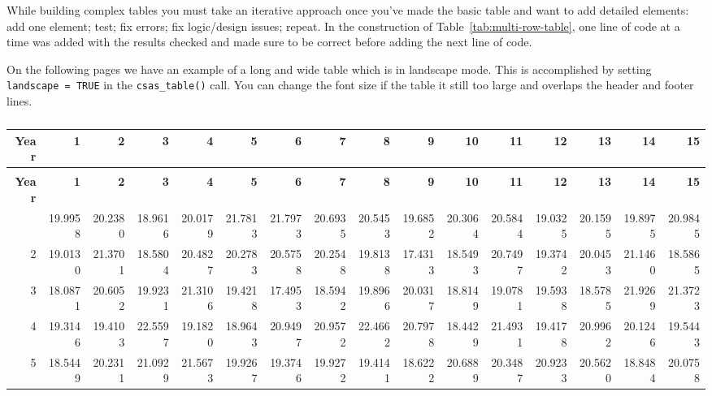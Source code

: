 \documentclass[12pt]{article}\usepackage[]{graphicx}\usepackage[]{color}
\begin{document}
While building complex tables you must take an iterative approach once you've made the basic table and want to add detailed elements: add one element; test; fix errors; fix logic/design issues; repeat. In the construction of Table~\ref{tab:multi-row-table}, one line of code at a time was added with the results checked and made sure to be correct before adding the next line of code.

On the following pages we have an example of a long and wide table which is in landscape mode. This is accomplished by setting \texttt{landscape\ =\ TRUE} in the \texttt{csas\_table()} call. You can change the font size if the table it still too large and overlaps the header and footer lines.

\clearpage

\begingroup\fontsize{8}{10}\selectfont
\begin{landscape}\begingroup\fontsize{8}{10}\selectfont
\begin{longtable}[t]{rrrrrrrrrrrrrrrr}
\caption{\label{tab:widelong}A long and wide table}\\
\toprule
\textbf{Year} & \textbf{1} & \textbf{2} & \textbf{3} & \textbf{4} & \textbf{5} & \textbf{6} & \textbf{7} & \textbf{8} & \textbf{9} & \textbf{10} & \textbf{11} & \textbf{12} & \textbf{13} & \textbf{14} & \textbf{15}\\
\midrule
\endfirsthead
\caption*{}\\
\toprule
\textbf{Year} & \textbf{1} & \textbf{2} & \textbf{3} & \textbf{4} & \textbf{5} & \textbf{6} & \textbf{7} & \textbf{8} & \textbf{9} & \textbf{10} & \textbf{11} & \textbf{12} & \textbf{13} & \textbf{14} & \textbf{15}\\
\midrule
\endhead
\
\endfoot
\bottomrule
\endlastfoot
1 & 19.9958 & 20.2380 & 18.9616 & 20.0179 & 21.7813 & 21.7973 & 20.6935 & 20.5453 & 19.6852 & 20.3064 & 20.5844 & 19.0325 & 20.1595 & 19.8975 & 20.9845\\
2 & 19.0130 & 21.3701 & 18.5804 & 20.4827 & 20.2783 & 20.5758 & 20.2548 & 19.8138 & 17.4313 & 18.5493 & 20.7497 & 19.3742 & 20.0453 & 21.1460 & 18.5865\\
3 & 18.0871 & 20.6052 & 19.9231 & 21.3106 & 19.4218 & 17.4953 & 18.5942 & 19.8966 & 20.0317 & 18.8149 & 19.0781 & 19.5938 & 18.5785 & 21.9269 & 21.3723\\
4 & 19.3146 & 19.4103 & 22.5597 & 19.1820 & 18.9643 & 20.9497 & 20.9572 & 22.4662 & 20.7978 & 18.4429 & 21.4931 & 19.4178 & 20.9962 & 20.1246 & 19.5443\\
5 & 18.5449 & 20.2311 & 21.0929 & 21.5673 & 19.9267 & 19.3746 & 19.9272 & 19.4141 & 18.6222 & 20.6889 & 20.3487 & 20.9233 & 20.5620 & 18.8484 & 20.0758\\

\end{longtable}
\end{landscape}
\end{document}
